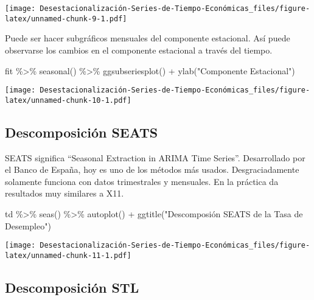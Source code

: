 \documentclass[
]{article}
\newenvironment{Shaded}{\begin{snugshade}}{\end{snugshade}}
\newcommand{\FunctionTok}[1]{\textcolor[rgb]{0.00,0.00,0.00}{#1}}
\newcommand{\NormalTok}[1]{#1}
\newcommand{\SpecialCharTok}[1]{\textcolor[rgb]{0.00,0.00,0.00}{#1}}
\newcommand{\StringTok}[1]{\textcolor[rgb]{0.31,0.60,0.02}{#1}}
\begin{document}
\texttt{[image: Desestacionalización-Series-de-Tiempo-Económicas\_files/figure-latex/unnamed-chunk-9-1.pdf]}

Puede ser hacer subgráficos mensuales del componente estacional. Así
puede observarse los cambios en el componente estacional a través del
tiempo.

\begin{Shaded}
\begin{Highlighting}[]
\NormalTok{fit }\SpecialCharTok{\%\textgreater{}\%} \FunctionTok{seasonal}\NormalTok{() }\SpecialCharTok{\%\textgreater{}\%} \FunctionTok{ggsubseriesplot}\NormalTok{() }\SpecialCharTok{+} \FunctionTok{ylab}\NormalTok{(}\StringTok{"Componente Estacional"}\NormalTok{)}
\end{Highlighting}
\end{Shaded}

\texttt{[image: Desestacionalización-Series-de-Tiempo-Económicas\_files/figure-latex/unnamed-chunk-10-1.pdf]}

\hypertarget{descomposiciuxf3n-seats}{%
\subsection{Descomposición SEATS}\label{descomposiciuxf3n-seats}}

SEATS significa ``Seasonal Extraction in ARIMA Time Series''.
Desarrollado por el Banco de España, hoy es uno de los métodos más
usados. Desgraciadamente solamente funciona con datos trimestrales y
mensuales. En la práctica da resultados muy similares a X11.

\begin{Shaded}
\begin{Highlighting}[]
\NormalTok{td }\SpecialCharTok{\%\textgreater{}\%} \FunctionTok{seas}\NormalTok{() }\SpecialCharTok{\%\textgreater{}\%}
\FunctionTok{autoplot}\NormalTok{() }\SpecialCharTok{+}
  \FunctionTok{ggtitle}\NormalTok{(}\StringTok{"Descomposión SEATS de la Tasa de Desempleo"}\NormalTok{)}
\end{Highlighting}
\end{Shaded}

\texttt{[image: Desestacionalización-Series-de-Tiempo-Económicas\_files/figure-latex/unnamed-chunk-11-1.pdf]}

\hypertarget{descomposiciuxf3n-stl}{%
\subsection{Descomposición STL}\label{descomposiciuxf3n-stl}}
\end{document}
